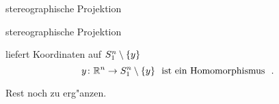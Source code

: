 \documentclass[class=article, crop=false]{standalone}
\begin{document}
\begin{zettel}{stereographische Projektion}
\begin{flashcard}[tfoqivuj]{stereographische Projektion}
	\begin{definition}
		liefert Koordinaten auf $S_1^n \setminus \set{y}$
		\[
			y \from \R^n\to S_1^n \setminus \set{y} \tx{ ist ein Homomorphismus }
		.\]

	\end{definition}

	Rest noch zu erg"anzen.

\end{flashcard}
\end{zettel}
\end{document}
